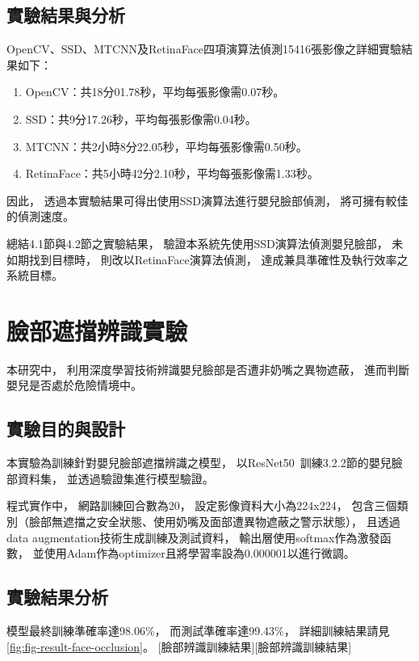 \documentclass[class=NCU_thesis, crop=false]{standalone}
\begin{document}
\subsection{實驗結果與分析}
OpenCV、SSD、MTCNN及RetinaFace四項演算法偵測15416張影像之詳細實驗結果如下：
\begin{enumerate}
    \item OpenCV：共18分01.78秒，平均每張影像需0.07秒。
    \item SSD：共9分17.26秒，平均每張影像需0.04秒。
    \item MTCNN：共2小時8分22.05秒，平均每張影像需0.50秒。
    \item RetinaFace：共5小時42分2.10秒，平均每張影像需1.33秒。
\end{enumerate}

因此，
透過本實驗結果可得出使用SSD演算法進行嬰兒臉部偵測，
將可擁有較佳的偵測速度。

總結4.1節與4.2節之實驗結果，
驗證本系統先使用SSD演算法偵測嬰兒臉部，
未如期找到目標時，
則改以RetinaFace演算法偵測，
達成兼具準確性及執行效率之系統目標。

\section{臉部遮擋辨識實驗}
本研究中，
利用深度學習技術辨識嬰兒臉部是否遭非奶嘴之異物遮蔽，
進而判斷嬰兒是否處於危險情境中。

\subsection{實驗目的與設計}
本實驗為訓練針對嬰兒臉部遮擋辨識之模型，
以ResNet50~\cite{he_deep_2016}訓練3.2.2節的嬰兒臉部資料集，
並透過驗證集進行模型驗證。

程式實作中，
網路訓練回合數為20，
設定影像資料大小為224x224，
包含三個類別（臉部無遮擋之安全狀態、使用奶嘴及面部遭異物遮蔽之警示狀態），
且透過data augmentation技術生成訓練及測試資料，
輸出層使用softmax作為激發函數，
並使用Adam作為optimizer且將學習率設為0.000001以進行微調。

\subsection{實驗結果分析}
模型最終訓練準確率達98.06\%，
而測試準確率達99.43\%，
詳細訓練結果請見\cref{fig:fig-result-face-occlusion}。
[臉部辨識訓練結果][臉部辨識訓練結果]
\end{document}
